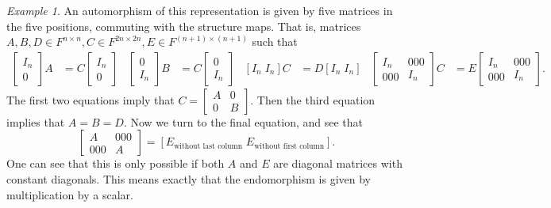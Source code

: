 \documentclass[a4paper]{amsart}
\theoremstyle{plain}
\theoremstyle{definition}
\theoremstyle{remark}
\newtheorem{example}[theorem]{Example}
\begin{document}
\begin{example}
An automorphism of this representation is given by five matrices in the five positions, commuting with the structure maps. That is, matrices \( A, B, D \in F^{n \times n}, C \in F^{2n \times 2n}, E \in F^{(n+1) \times (n+1)} \) such that
\begin{align*}
\left[ \begin{smallmatrix} I_n \\ 0 \end{smallmatrix} \right] A & = C \left[ \begin{smallmatrix} I_n \\ 0 \end{smallmatrix} \right] & \left[ \begin{smallmatrix} 0 \\ I_n \end{smallmatrix} \right] B & = C \left[ \begin{smallmatrix} 0 \\ I_n \end{smallmatrix} \right] &
\left[ I_n \; I_n \right] C & = D \left[ I_n \; I_n \right] & \left[ \begin{smallmatrix} I_n \\ \scriptscriptstyle 000 \end{smallmatrix} \begin{smallmatrix} \scriptscriptstyle 000 \\ I_n \end{smallmatrix} \right] C & = E \left[ \begin{smallmatrix} I_n \\ \scriptscriptstyle 000 \end{smallmatrix} \begin{smallmatrix} \scriptscriptstyle 000 \\ I_n \end{smallmatrix} \right].
\end{align*}
The first two equations imply that \( C = \left[ \begin{smallmatrix} A & 0 \\ 0 & B \end{smallmatrix} \right] \). Then the third equation implies that \( A = B = D \). Now we turn to the final equation, and see that
\[ \left[ \begin{smallmatrix} A \\ \scriptscriptstyle 000 \end{smallmatrix} \begin{smallmatrix} \scriptscriptstyle 000 \\ A \end{smallmatrix} \right] = \left[ E_{\text{without last column}} \; E_{\text{without first column}} \right]. \]
One can see that this is only possible if both \( A \) and \( E \) are diagonal matrices with constant diagonals. This means exactly that the endomorphism is given by multiplication by a scalar.
\end{example}
\end{document}
